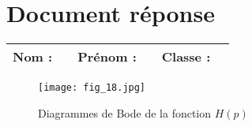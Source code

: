 \newpage
\section*{Document réponse}
\begin{center}
\begin{tabular}{p{}p{}|p{}p{}|p{}p{}}
\textbf{Nom : } & &
\textbf{Prénom : } &  &
\textbf{Classe : } &  \\
\hline
\end{tabular}
\end{center}

\begin{figure}[H]
\centering
\texttt{[image: fig\_18.jpg]}
\caption{\label{fig:C} Diagrammes de Bode de la fonction $H(p)$ }%
\end{figure}


%
%
%
%
%
